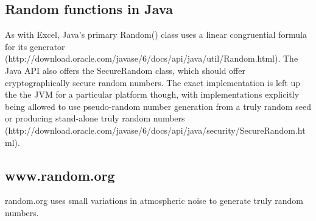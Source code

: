 \documentclass{article}
\begin{document}
\subsection{Random functions in Java}
\par As with Excel, Java's primary Random() class uses a linear congruential formula for its generator (http://download.oracle.com/javase/6/docs/api/java/util/Random.html). The Java API also offers the SecureRandom class, which should offer cryptographically secure random numbers. The exact implementation is left up the the JVM for a particular platform though, with implementations explicitly being allowed to use pseudo-random number generation from a truly random seed or producing stand-alone truly random numbers (http://download.oracle.com/javase/6/docs/api/java/security/SecureRandom.html).

\subsection{www.random.org}
\par random.org uses small variations in atmospheric noise to generate truly random numbers.
\end{document}
